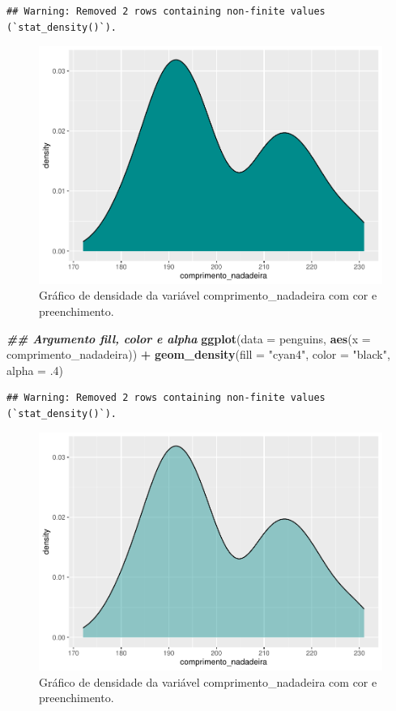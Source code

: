 \documentclass[
]{article}
\newenvironment{Shaded}{\begin{snugshade}}{\end{snugshade}}
\newcommand{\AttributeTok}[1]{\textcolor[rgb]{0.13,0.29,0.53}{#1}}
\newcommand{\DecValTok}[1]{\textcolor[rgb]{0.00,0.00,0.81}{#1}}
\newcommand{\DocumentationTok}[1]{\textcolor[rgb]{0.56,0.35,0.01}{\textbf{\textit{#1}}}}
\newcommand{\FunctionTok}[1]{\textcolor[rgb]{0.13,0.29,0.53}{\textbf{#1}}}
\newcommand{\NormalTok}[1]{#1}
\newcommand{\SpecialCharTok}[1]{\textcolor[rgb]{0.81,0.36,0.00}{\textbf{#1}}}
\newcommand{\StringTok}[1]{\textcolor[rgb]{0.31,0.60,0.02}{#1}}
\begin{document}
\begin{verbatim}
## Warning: Removed 2 rows containing non-finite values (`stat_density()`).
\end{verbatim}

\begin{figure}
\includegraphics[width=0.75\linewidth,height=0.75\textheight]{epr_files/figure-latex/fig-dens-flipper-color-1} \caption{Gráfico de densidade da variável comprimento_nadadeira com cor e preenchimento.}\label{fig:fig-dens-flipper-color-1}
\end{figure}

\begin{Shaded}
\begin{Highlighting}[]
\DocumentationTok{\#\# Argumento fill, color e alpha}
\FunctionTok{ggplot}\NormalTok{(}\AttributeTok{data =}\NormalTok{ penguins, }\FunctionTok{aes}\NormalTok{(}\AttributeTok{x =}\NormalTok{ comprimento\_nadadeira)) }\SpecialCharTok{+}
    \FunctionTok{geom\_density}\NormalTok{(}\AttributeTok{fill =} \StringTok{"cyan4"}\NormalTok{, }\AttributeTok{color =} \StringTok{"black"}\NormalTok{, }\AttributeTok{alpha =}\NormalTok{ .}\DecValTok{4}\NormalTok{)}
\end{Highlighting}
\end{Shaded}

\begin{verbatim}
## Warning: Removed 2 rows containing non-finite values (`stat_density()`).
\end{verbatim}

\begin{figure}
\includegraphics[width=0.75\linewidth,height=0.75\textheight]{epr_files/figure-latex/fig-dens-flipper-color-2} \caption{Gráfico de densidade da variável comprimento_nadadeira com cor e preenchimento.}\label{fig:fig-dens-flipper-color-2}
\end{figure}
\end{document}
